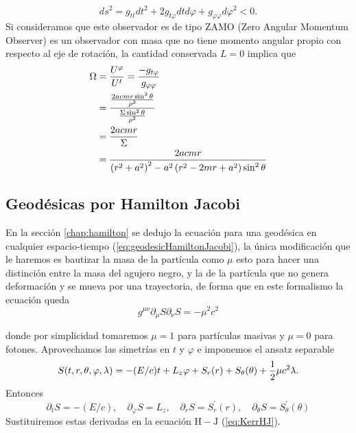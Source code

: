 \begin{equation}
    d s^2=g_{t t}dt^2+2 g_{t \varphi} dtd\varphi+g_{\varphi \varphi}d\varphi^2<0.
\end{equation}
Si consideramos que este observador es de tipo ZAMO  (Zero Angular Momentum Observer) es un observador con masa que no tiene momento angular propio con respecto al eje de rotación, la cantidad conservada $L=0$ implica que
\begin{equation}
    \begin{aligned}
        \Omega & =\frac{U^{\varphi}}{U^t} = \frac{ - g_{t \varphi}}{g_{\varphi \varphi}}                  \\
               & = \frac{ \frac{2a c mr \sin^2\theta}{\rho^2}}{\frac{\Sigma \sin^2\theta}{\rho^2}}          \\
               & = \frac{2a c mr}{\Sigma}                                                               \\
               & = \frac{2a c m r}{\left(r^2+a^2\right)^2-a^2\left(r^2-2 m r+a^2\right) \sin ^2 \theta}
    \end{aligned}
\end{equation}

\subsection{Geodésicas por Hamilton Jacobi}
En la sección \ref{chap:hamilton} se dedujo la ecuación para una geodésica en cualquier espacio-tiempo (\ref{eq:geodesicHamiltonJacobi}), la única modificación que le haremos es bautizar la masa de la partícula como $\mu$ esto para hacer una distinción  entre la masa del agujero negro, y la de la partícula que no genera deformación y se mueva por una trayectoria, de forma que en este formalismo la ecuación queda
\begin{equation}
    g^{\mu \nu} \partial_\mu S \partial_\nu S=-\mu^2c^2
    \label{eq:KerrHJ}
\end{equation}

donde por simplicidad tomaremos $\mu=1$ para partículas masivas y $\mu=0$ para fotones.
Aprovechamos las simetrías en $t$ y $\varphi$ e imponemos el ansatz separable
\begin{equation}
    S(t, r, \theta, \varphi, \lambda)=-(E/c) t+{L_z} \varphi+S_r(r)+S_\theta(\theta)+\frac{1}{2} \mu c^2\lambda.
\end{equation}
Entonces
\begin{equation}
    \partial_t S=-(E/c), \quad \partial_{\varphi} S={L_z}, \quad \partial_r S=S_r^{\prime}(r), \quad \partial_\theta S=S_\theta^{\prime}(\theta)
\end{equation}
Sustituiremos estas derivadas en la ecuación $\mathrm{H}-\mathrm{J}$ (\ref{eq:KerrHJ}).



